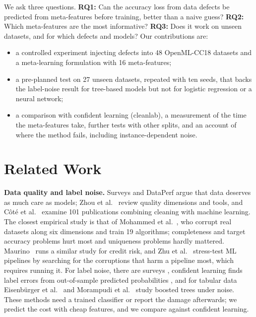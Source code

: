 \documentclass[conference]{IEEEtran}
\begin{document}
We ask three questions. \textbf{RQ1:} Can the accuracy loss from data defects be predicted from meta-features before training, better than a naive guess? \textbf{RQ2:} Which meta-features are the most informative? \textbf{RQ3:} Does it work on unseen datasets, and for which defects and models? Our contributions are:
\begin{itemize}[leftmargin=1.5em,itemsep=0pt]
  \item a controlled experiment injecting defects into 48 OpenML-CC18 datasets and a meta-learning formulation with 16 meta-features;
  \item a pre-planned test on 27 unseen datasets, repeated with ten seeds, that backs the label-noise result for tree-based models but not for logistic regression or a neural network;
  \item a comparison with confident learning (cleanlab), a measurement of the time the meta-features take, further tests with other splits, and an account of where the method fails, including instance-dependent noise.
\end{itemize}

\section{Related Work}\label{sec:related}
\textbf{Data quality and label noise.} Surveys \cite{zha2025survey,whang2021data} and DataPerf \cite{mazumder2023dataperf} argue that data deserves as much care as models; Zhou et al.~\cite{zhou2024dq} review quality dimensions and tools, and C{\^o}t{\'e} et al.~\cite{cote2023cleaning} examine 101 publications combining cleaning with machine learning. The closest empirical study is that of Mohammed et al.~\cite{mohammed2025effects}, who corrupt real datasets along six dimensions and train 19 algorithms; completeness and target accuracy problems hurt most and uniqueness problems hardly mattered. Maurino~\cite{maurino2025credit} runs a similar study for credit risk, and Zhu et al.~\cite{zhu2025stress} stress-test ML pipelines by searching for the corruptions that harm a pipeline most, which requires running it. For label noise, there are surveys \cite{frenay2014label,song2023noisy,li2024noisy}, confident learning finds label errors from out-of-sample predicted probabilities \cite{northcutt2021confident}, and for tabular data Eisenb{\"u}rger et al.~\cite{eisenburger2025gbdt} and Morampudi et al.~\cite{morampudi2026noise} study boosted trees under noise. These methods need a trained classifier or report the damage afterwards; we predict the cost with cheap features, and we compare against confident learning.
\end{document}
